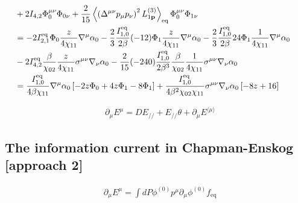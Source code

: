 \documentclass[aps,prd,preprint,nofootinbib,amsmath,amssymb,showpacs,longbibliography,singlecolumn,superscriptaddress,10pt]{revtex4-1}
\theoremstyle{plain}
\theoremstyle{definition}
\begin{document}
\begin{equation}
\begin{aligned}
\\
&
+
2 I_{4,2}  \Phi_{0}^{\mu \nu} \Phi_{0 \nu} 
+
\frac{2}{15}\left\langle \left( \Delta^{\mu \nu} p_{\mu} p_{\nu} \right)^{2}  L^{(3)}_{1 {\bf p}} \right\rangle_{\mathrm{eq}}  \Phi_{0}^{\mu \nu} \Phi_{1 \nu}
\\
&
=
- 2 I_{2,1}^{\mathrm{eq}}  \Phi_{0} \frac{z}{4\chi_{11}}\nabla ^{\mu }\alpha_{0}
-
\frac{2}{3} \frac{I_{1,0}^{\mathrm{eq}}}{2\beta} (-12) \Phi_{1} \frac{z}{4\chi_{11}}\nabla ^{\mu }\alpha_{0}
-
\frac{2}{3} \frac{I_{1,0}^{\mathrm{eq}}}{2\beta} 24  \Phi_{1} \frac{1}{4\chi_{11}}\nabla ^{\mu }\alpha_{0}
\\
&
-
2 I_{4,2}^{\mathrm{eq}}  \frac{\beta}{\chi_{02}} 
 \frac{z}{4\chi_{11}} \sigma^{\mu \nu }\nabla _{\nu }\alpha_{0} 
-
\frac{2}{15} (-240) \frac{I_{1,0}^{\mathrm{eq}}}{2\beta^{3}}  \frac{\beta}{\chi_{02}} 
\frac{1}{4\chi_{11}} \sigma^{\mu \nu }\nabla _{\nu} \alpha_{0}  
\\
&
=
\frac{I_{1,0}^{\mathrm{eq}}}{4 \beta\chi_{11}}\nabla ^{\mu }\alpha_{0}
\left[ 
- 
2 z \Phi_{0}
+
4 z \Phi_{1}
-
8 \Phi_{1}
\right]
+
\frac{I_{1,0}^{\mathrm{eq}}}{4\beta ^{2}\chi_{02} \chi_{11}} \sigma^{\mu \nu }\nabla _{\nu} \alpha_{0}
\left[ - 8z + 16 \right]
\end{aligned}    
\end{equation}




\begin{equation}
\begin{aligned}
&
\partial_{\mu}E^{\mu} = D E_{//} + E_{//} \theta + \partial_{\mu}E^{\langle \mu \rangle}  
\end{aligned}    
\end{equation}


\subsection{The information current in Chapman-Enskog [approach 2]}


\begin{equation}
\begin{aligned}
&
\partial_{\mu} E^{\mu}
=
\int dP \phi^{(0)} p^{\mu} \partial_{\mu}\phi^{(0)} f_{\mathrm{eq}}
\end{aligned}    
\end{equation}


\end{document}
